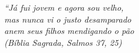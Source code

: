 \begin{epigrafe}
	\vspace*{\fill}
	\begin{flushright}

		\textit{``Já fui jovem e agora sou velho, \\
			mas nunca vi o justo desamparado \\
			anem seus filhos mendigando o pão \\
			(Bíblia Sagrada, Salmos 37, 25)}
	\end{flushright}
\end{epigrafe}
